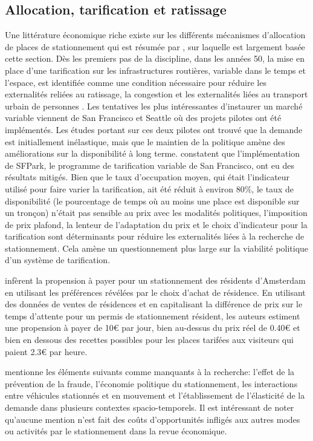   \subsection{Allocation, tarification et ratissage}
  Une littérature économique riche existe sur les différents mécanismes d'allocation de places de stationnement qui est résumée par \textcite{Inci:ReviewEconomics:2015}, sur laquelle est largement basée cette section. Dès les premiers pas de la discipline, dans les années 50, la mise en place d'une tarification sur les infrastructures routières, variable dans le temps et l'espace, est identifiée comme une condition nécessaire pour réduire les externalités reliées au ratissage, la congestion et les externalités liées au transport urbain de personnes \parencite{Vickrey:StatementJoint:1994}. Les tentatives les plus intéressantes d'instaurer un marché variable viennent de San Francisco et Seattle où des projets pilotes ont été implémentés. Les études portant sur ces deux pilotes ont trouvé que la demande est initiallement inélastique, mais que le maintien de la politique amène des améliorations sur la disponibilité à long terme. \textcite{Chatman:TheoryImplementation:2014} constatent que l'implémentation de SFPark, le programme de tarification variable de San Francisco, ont eu des résultats mitigés. Bien que le taux d'occupation moyen, qui était l'indicateur utilisé pour faire varier la tarification,  ait été réduit à environ 80\%, le taux de disponibilité (le pourcentage de temps où au moins une place est disponible sur un tronçon) n'était pas sensible au prix avec les modalités politiques, l'imposition de prix plafond, la lenteur de l'adaptation du prix et le choix d'indicateur pour la tarification sont déterminants pour réduire les externalités liées à la recherche de stationnement. Cela amène un questionnement plus large sur la viabilité politique d'un système de tarification.\par
  \textcite{vanOmmeren:RealPrice:2011} infèrent la propension à payer pour un stationnement des résidents d'Amsterdam en utilisant les préférences révélées par le choix d'achat de résidence. En utilisant des données de ventes de résidences et en capitalisant la différence de prix sur le temps d'attente pour un permis de stationnement résident, les auteurs estiment une propension à payer de 10€ par jour, bien au-dessus du prix réel de 0.40€ et bien en dessous des recettes possibles pour les places tarifées aux visiteurs qui paient 2.3€ par heure.\par
  \textcite{Inci:ReviewEconomics:2015} mentionne les éléments suivants comme manquants à la recherche: l'effet de la prévention de la fraude, l'économie politique du stationnement, les interactions entre véhicules stationnés et en mouvement et l'établissement de l'élasticité de la demande dans plusieurs contextes spacio-temporels. Il est intéressant de noter qu'aucune mention n'est fait des coûts d'opportunités infligés aux autres modes ou activités par le stationnement dans la revue économique.

